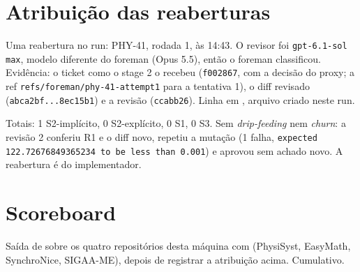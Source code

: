 \documentclass[11pt,a4paper]{article}
\begin{document}
\section{Atribuição das reaberturas}

Uma reabertura no run: PHY-41, rodada 1, às 14:43. O revisor foi
\texttt{gpt-6.1-sol max}, modelo diferente do foreman (Opus 5.5), então o
foreman classificou. Evidência: o ticket como o stage 2 o recebeu
(\texttt{f002867}, com a decisão do proxy; a ref
\texttt{refs/foreman/phy-41-attempt1} para a tentativa 1), o diff revisado
(\texttt{abca2bf...8ec15b1}) e a revisão (\texttt{ccabb26}). Linha em
, arquivo criado neste run.

\medskip
{}

\medskip
Totais: 1 S2-implícito, 0 S2-explícito, 0 S1, 0 S3. Sem \emph{drip-feeding}
nem \emph{churn}: a revisão 2 conferiu R1 e o diff novo, repetiu a mutação
(1 falha, \texttt{expected 122.72676849365234 to be less than 0.001}) e aprovou
sem achado novo. A reabertura é do implementador.

\section{Scoreboard}

Saída de  sobre os quatro repositórios
desta máquina com  (PhysiSyst, EasyMath,
SynchroNice, SIGAA-ME), depois de registrar a atribuição acima. Cumulativo.
\end{document}
